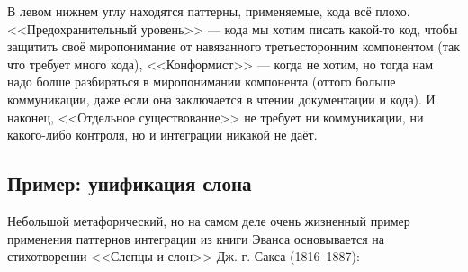 \documentclass{../../text-style}
\begin{document}
В левом нижнем углу находятся паттерны, применяемые, кода всё плохо. <<Предохранительный уровень>> --- кода мы хотим писать какой-то код, чтобы защитить своё миропонимание от навязанного третьесторонним компонентом (так что требует много кода), <<Конформист>> --- когда не хотим, но тогда нам надо болше разбираться в миропонимании компонента (оттого больше коммуникации, даже если она заключается в чтении документации и кода). И наконец, <<Отдельное существование>> не требует ни коммуникации, ни какого-либо контроля, но и интеграции никакой не даёт.

\subsection{Пример: унификация слона}

Небольшой метафорический, но на самом деле очень жизненный пример применения паттернов интеграции из книги Эванса основывается на стихотворении <<Слепцы и слон>> Дж. г. Сакса (1816--1887):
\end{document}
